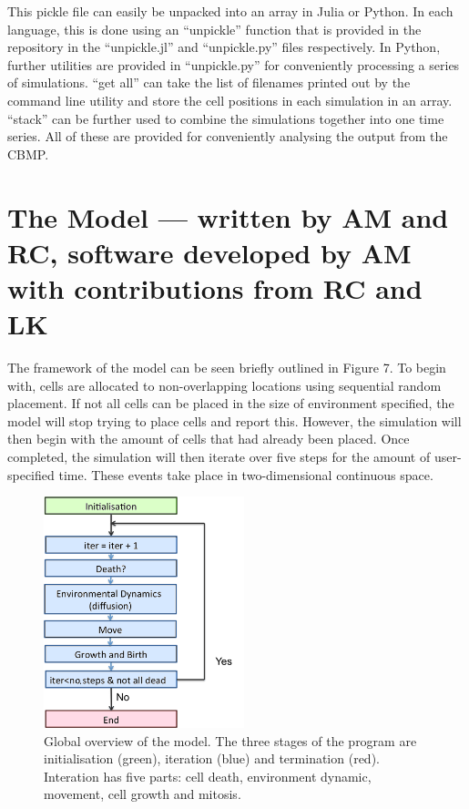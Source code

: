 \documentclass[12pt]{article}
\begin{document}
This pickle file can easily be unpacked into an array in Julia or 
Python. In each language, this is done using an ``unpickle'' function 
that is provided in the repository in the ``unpickle.jl'' and 
``unpickle.py'' files respectively. In Python, further utilities are 
provided in ``unpickle.py'' for conveniently processing a series of 
simulations. ``get all'' can take the list of filenames printed out by 
the command line utility and store the cell positions in each simulation 
in an array. ``stack'' can be further used to combine the simulations 
together into one time series. All of these are provided for 
conveniently analysing the output from the CBMP.

\section{The Model --- written by AM and RC, software developed by AM with contributions from RC and LK}
The framework of the model can be seen briefly outlined in Figure 7. To 
begin with, cells are allocated to non-overlapping locations using 
sequential random placement. If not all cells can be placed in the size 
of environment specified, the model will stop trying to place cells and 
report this. However, the simulation will then begin with the amount of 
cells that had already been placed. Once completed, the simulation will 
then iterate over five steps for the amount of user-specified time. 
These events take place in two-dimensional continuous space. 

\begin{figure}[H]
\centering
\includegraphics[width=5.81cm]{media/algorithmoverview.png}
\caption[]{Global overview of the model. The three stages of the program
  are initialisation (green), iteration (blue) and termination (red). 
  Interation has five parts: cell death, environment dynamic, movement, cell 
growth and mitosis.}
\end{figure}
\end{document}
